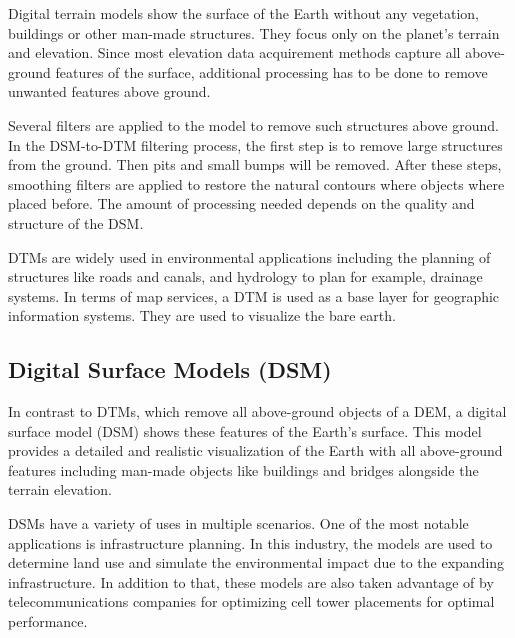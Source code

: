 Digital terrain models show the surface of the Earth without any vegetation, buildings or other man-made structures. They focus only on the planet's terrain and elevation. Since most elevation data acquirement methods capture all above-ground features of the surface, additional processing has to be done to remove unwanted features above ground.\ \cite{Web:57}

Several filters are applied to the model to remove such structures above ground. In the DSM-to-DTM filtering process, the first step is to remove large structures from the ground. Then pits and small bumps will be removed. After these steps, smoothing filters are applied to restore the natural contours where objects where placed before. The amount of processing needed depends on the quality and structure of the DSM.\ \cite{Web:58}

DTMs are widely used in environmental applications including the planning of structures like roads and canals, and hydrology to plan for example, drainage systems. In terms of map services, a DTM is used as a base layer for geographic information systems. They are used to visualize the bare earth.\cite{Web:59}


\subsection{Digital Surface Models (DSM)}

In contrast to DTMs, which remove all above-ground objects of a DEM, a digital surface model (DSM) shows these features of the Earth's surface. This model provides a detailed and realistic visualization of the Earth with all above-ground features including man-made objects like buildings and bridges alongside the terrain elevation.\ \cite{Web:60}

DSMs have a variety of uses in multiple scenarios. One of the most notable applications is infrastructure planning. In this industry, the models are used to determine land use and simulate the environmental impact due to the expanding infrastructure. In addition to that, these models are also taken advantage of by telecommunications companies for optimizing cell tower placements for optimal performance.\ \cite{Web:61}